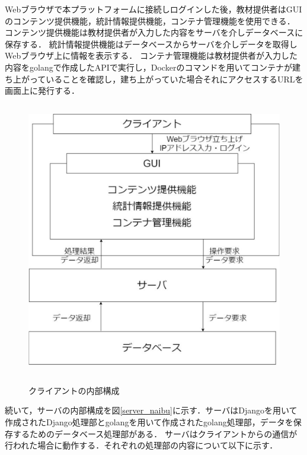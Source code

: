 Webブラウザで本プラットフォームに接続しログインした後，教材提供者はGUIのコンテンツ提供機能，統計情報提供機能，コンテナ管理機能を使用できる．
コンテンツ提供機能は教材提供者が入力した内容をサーバを介しデータベースに保存する．
統計情報提供機能はデータベースからサーバを介しデータを取得しWebブラウザ上に情報を表示する．
コンテナ管理機能は教材提供者が入力した内容をgolangで作成したAPIで実行し，Dockerのコマンドを用いてコンテナが建ち上がっていることを確認し，建ち上がっていた場合それにアクセスするURLを画面上に発行する．

\begin{figure}[htbp]
    \begin{center}
        \includegraphics[width=13cm,height=12cm,keepaspectratio]{client_arch-crop.pdf}\\
    \end{center}
    \caption{クライアントの内部構成}
    \label{client_naibu}
\end{figure}

\newpage
続いて，サーバの内部構成を図\ref{server_naibu}に示す．サーバはDjangoを用いて作成されたDjango処理部とgolangを用いて作成されたgolang処理部，データを保存するためのデータベース処理部がある．
サーバはクライアントからの通信が行われた場合に動作する．それぞれの処理部の内容について以下に示す．

